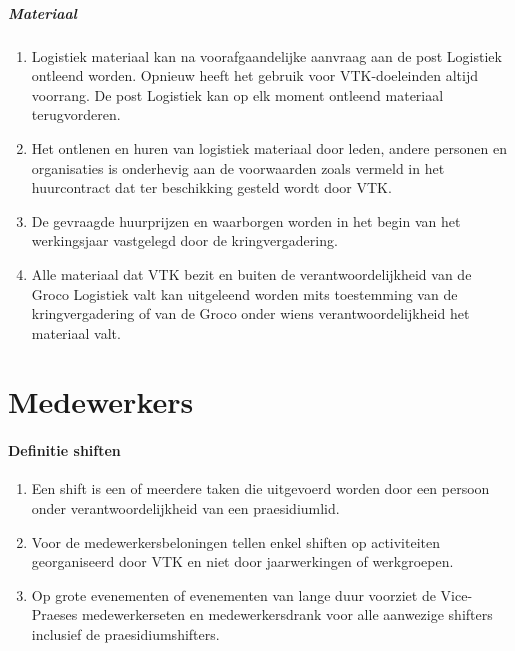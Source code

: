     \subsubsection{Materiaal}
    \begin{enumerate}
    \item Logistiek materiaal kan na voorafgaandelijke aanvraag aan
    de post Logistiek ontleend worden. Opnieuw heeft het gebruik voor VTK-doeleinden altijd voorrang. De post Logistiek kan op elk moment ontleend materiaal terugvorderen.
    \item Het ontlenen en huren van logistiek materiaal door leden, andere personen en organisaties is onderhevig aan de voorwaarden zoals vermeld in het huurcontract dat ter beschikking gesteld wordt door VTK.
    \item De gevraagde huurprijzen en waarborgen worden in het begin van het werkingsjaar vastgelegd door de kringvergadering.
    \item Alle materiaal dat VTK bezit en buiten de verantwoordelijkheid van de Groco Logistiek valt kan uitgeleend worden mits toestemming van de kringvergadering of van de Groco onder wiens verantwoordelijkheid het materiaal valt.
    \end{enumerate}


\part{Medewerkers}

    \subsection{Definitie shiften}
    \begin{enumerate}
    \item Een shift is een of meerdere taken die uitgevoerd worden door een persoon onder verantwoordelijkheid van een praesidiumlid.
    \item Voor de medewerkersbeloningen tellen enkel shiften op activiteiten georganiseerd door VTK en niet door jaarwerkingen of werkgroepen.
    \item Op grote evenementen of evenementen van lange duur voorziet de Vice-Praeses medewerkerseten en medewerkersdrank voor alle aanwezige shifters inclusief de praesidiumshifters.
    \end{enumerate}

